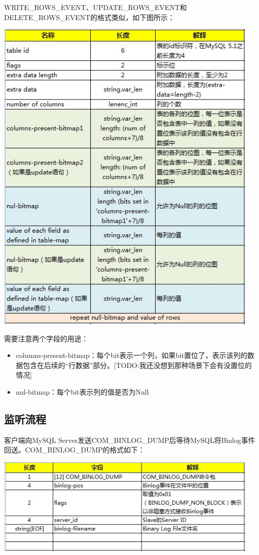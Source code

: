 \documentclass[a4paper, titlepage, 10pt, bookmark]{article}
\begin{document}
WRITE\_ROWS\_EVENT、UPDATE\_ROWS\_EVENT和DELETE\_ROWS\_EVENT的格式类似，如下图所示：
\begin{center}
\includegraphics[width=5in]{025.jpg}
\end{center}

需要注意两个字段的用途：
\begin{itemize}
    \item columns-present-bitmap：每个bit表示一个列，如果bit置位了，表示该列的数据包含在后续的“行数据”部分。[TODO:我还没想到那种场景下会有没置位的情况]
    \item nul-bitmap：每个bit表示列的值是否为Null
\end{itemize}



\subsection{监听流程}
客户端向MySQL Server发送COM\_BINLOG\_DUMP后等待MySQL将Binlog事件回送。COM\_BINLOG\_DUMP的格式如下：
\begin{center}
\includegraphics[width=5in]{026.jpg}
\end{center}
\end{document}
